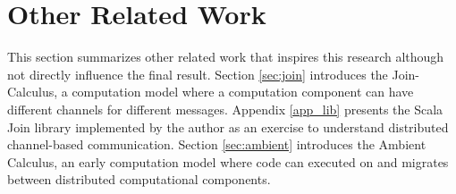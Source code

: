 \begin{comment}
\section{Function and Partial Function}
\label{scala_pattern}

There are two types of function in Scala: partial function and total function.
A partial function has type {\tt PartialFunction} while a total function has type
{\tt Function}.  Figure~\ref{scala_pf_f} gives an example of using partial function
and total function.  The domain of a partial function does not necessarily 
include all values of its input type.  By contrast, Scala checks the completeness
of a total function (e.g. line 22 and 28).  The difference between partial function
and total function affects the API design of the {\tt receive} function in Akka 
and TAkka, discussed in Section~\ref{takka_actor}.


There are two distinctions between {\tt Function} and {\tt PartialFunction}.  
The advantage of {\tt PartialFunction} is that users can define a new function 
that merges the input domains of two other partial functions.  The advantage of 
{\tt Function} is that the completeness of pattern matching can be checked 
if the input type of the function is a sealed trait or a sealed 
class, whose sub-classes must be defined in the same file.   
Figure~\ref{scala_pf_f} gives a Scala example that illustrates the above 
features.  The last function, {\tt fruitNameF}, shows that the syntactically 
shorter definition of {\tt fruitnamePF} can be equivalently defined.  
As shown in Figure~\ref{akka_actor_api}, the {\tt receive} method of Akka {\tt Actor}
has type {\tt PartialFunction[Any, Unit]}.  As the {\tt receive} method is 
not visible outside the {\tt Actor} class, the advantage of using 
{\tt PartialFunction} is not clear.  On the other hand, a completeness check of 
message patterns, which is provided by the {\tt Function} class, might be
useful in practice.
\end{comment}

\newpage
\section{Other Related Work}

This section summarizes other related work that inspires this research although not directly influence the final result.  Section \ref{sec:join} introduces the Join-Calculus, a computation model where a computation component can have different channels for different messages. 
Appendix \ref{app_lib} presents the Scala Join library implemented by the author as an exercise to understand distributed channel-based communication.  Section \ref{sec:ambient} introduces the Ambient Calculus, an early computation model where code can executed on and migrates between distributed computational components.

